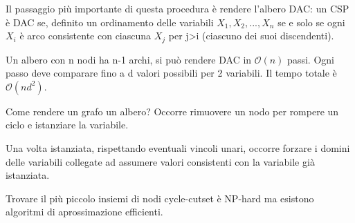 Il passaggio più importante di questa procedura è rendere l'albero
DAC: un CSP è DAC se, definito un ordinamento delle variabili
$X_1, X_2, ..., X_n$ se e solo se ogni $X_i$ è arco consistente
con ciascuna $X_j$ per j>i (ciascuno dei suoi discendenti).

Un albero con n nodi ha n-1 archi, si può rendere DAC in
$\mathcal{O}(n)$ passi. Ogni passo deve comparare fino a
d valori possibili per 2 variabili. Il tempo totale è
$\mathcal{O}(nd^2)$.

Come rendere un grafo un albero? Occorre rimuovere un nodo per
rompere un ciclo e istanziare la variabile.

Una volta istanziata, rispettando eventuali vincoli unari,
occorre forzare i domini delle variabili collegate ad assumere
valori consistenti con la variabile già istanziata.

Trovare il più piccolo insiemi di nodi cycle-cutset è NP-hard
ma esistono algoritmi di aprossimazione efficienti.
